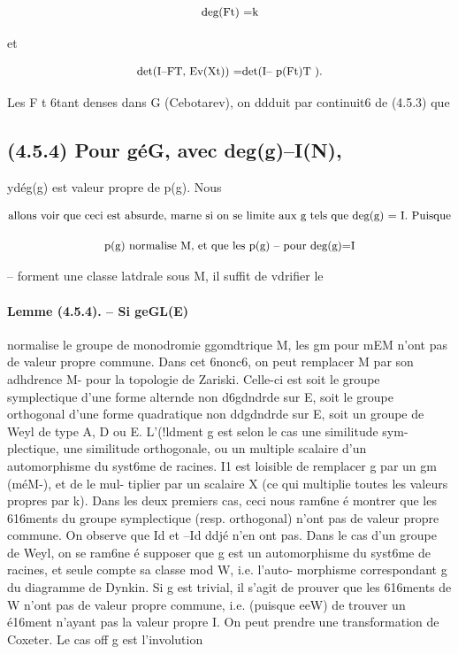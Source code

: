 \documentclass[11pt]{article}
\theoremstyle{remark}
\begin{document}
\[\text{\small deg(Ft) =k}\]

et

\[\text{\small det(I--FT, Ev(Xt)) =det(I-- p(Ft)T ).}\]

Les F t 6tant denses dans G (Cebotarev), on ddduit par continuit6 de (4.5.3) que

\subsection*{(4.5.4) Pour géG, avec deg(g)--I(N),}

ydég(g) est valeur propre de p(g). Nous

\[\text{\small allons voir que ceci est absurde, marne si on se limite aux g tels que deg(g) = I. Puisque}\]

\[\text{\small p(g) normalise M, et que les p(g) -- pour deg(g)=I}\]

-- forment une classe latdrale sous M, il suffit de vdrifier le

\paragraph{Lemme (4.5.4). -- Si geGL(E)}

normalise le groupe de monodromie ggomdtrique M, les gm pour mEM n'ont pas de valeur propre commune. Dans cet 6nonc6, on peut remplacer M par son adhdrence M- pour la topologie de Zariski. Celle-ci est soit le groupe symplectique d'une forme alternde non d6gdndrde sur E, soit le groupe orthogonal d'une forme quadratique non ddgdndrde sur E, soit un groupe de Weyl de type A, D ou E. L'(!ldment g est selon le cas une similitude sym- plectique, une similitude orthogonale, ou un multiple scalaire d'un automorphisme du syst6me de racines. I1 est loisible de remplacer g par un gm (méM-), et de le mul- tiplier par un scalaire X (ce qui multiplie toutes les valeurs propres par k). Dans les deux premiers cas, ceci nous ram6ne é montrer que les 616ments du groupe symplectique (resp. orthogonal) n'ont pas de valeur propre commune. On observe que Id et --Id ddjé n'en ont pas. Dans le cas d'un groupe de Weyl, on se ram6ne é supposer que g est un automorphisme du syst6me de racines, et seule compte sa classe mod W, i.e. l'auto- morphisme correspondant g du diagramme de Dynkin. Si g est trivial, il s'agit de prouver que les 616ments de W n'ont pas de valeur propre commune, i.e. (puisque eeW) de trouver un é16ment n'ayant pas la valeur propre I. On peut prendre une transformation de Coxeter. Le cas off g est l'involution
\end{document}
